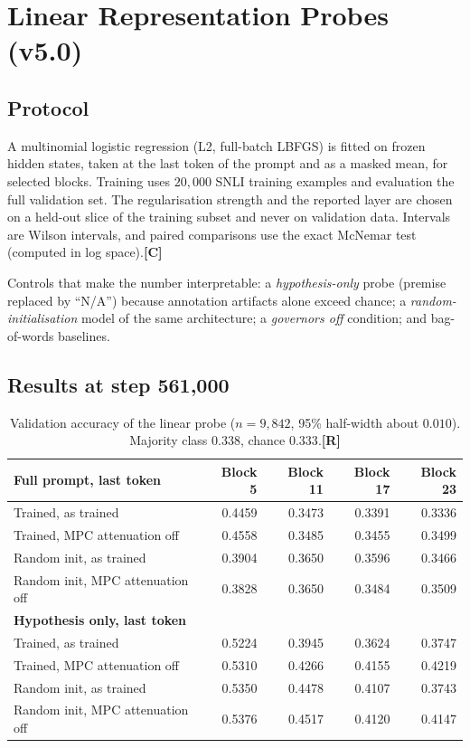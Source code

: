 \documentclass[11pt,a4paper]{article}
\newcommand{\sR}{\textbf{[R]}}
\newcommand{\sC}{\textbf{[C]}}
\begin{document}
\section{Linear Representation Probes (v5.0)}\label{sec:probes}

\subsection{Protocol}
A multinomial logistic regression (L2, full-batch LBFGS) is fitted on frozen hidden states, taken at the last token of the prompt and as a masked mean, for selected blocks. Training uses $20{,}000$ SNLI training examples and evaluation the full validation set. The regularisation strength and the reported layer are chosen on a held-out slice of the training subset and never on validation data. Intervals are Wilson intervals, and paired comparisons use the exact McNemar test (computed in log space).\sC{}

Controls that make the number interpretable: a \emph{hypothesis-only} probe (premise replaced by ``N/A'') because annotation artifacts alone exceed chance; a \emph{random-initialisation} model of the same architecture; a \emph{governors off} condition; and bag-of-words baselines.

\subsection{Results at step 561{,}000}
\begin{table}[h]
\centering
\small
\begin{tabular}{@{}lrrrr@{}}
\toprule
\textbf{Full prompt, last token} & \textbf{Block 5} & \textbf{Block 11} & \textbf{Block 17} & \textbf{Block 23}\\
\midrule
Trained, as trained & 0.4459 & 0.3473 & 0.3391 & 0.3336\\
Trained, MPC attenuation off & 0.4558 & 0.3485 & 0.3455 & 0.3499\\
Random init, as trained & 0.3904 & 0.3650 & 0.3596 & 0.3466\\
Random init, MPC attenuation off & 0.3828 & 0.3650 & 0.3484 & 0.3509\\
\midrule
\textbf{Hypothesis only, last token} & & & &\\
\midrule
Trained, as trained & 0.5224 & 0.3945 & 0.3624 & 0.3747\\
Trained, MPC attenuation off & 0.5310 & 0.4266 & 0.4155 & 0.4219\\
Random init, as trained & 0.5350 & 0.4478 & 0.4107 & 0.3743\\
Random init, MPC attenuation off & 0.5376 & 0.4517 & 0.4120 & 0.4147\\
\bottomrule
\end{tabular}
\caption{Validation accuracy of the linear probe ($n = 9{,}842$, 95\% half-width about $0.010$). Majority class $0.338$, chance $0.333$.\sR{}}
\end{table}
\end{document}
